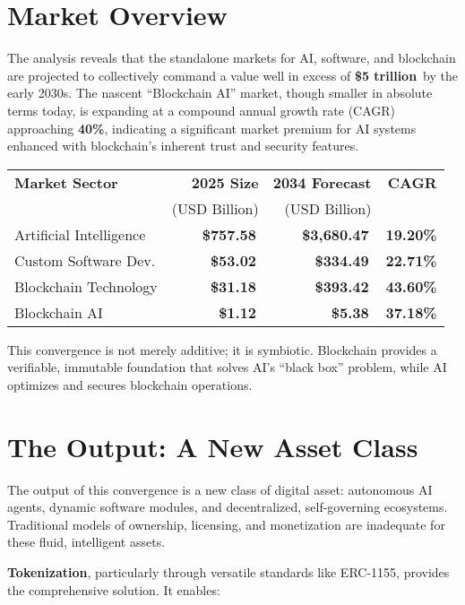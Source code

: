 \documentclass[11pt,a4paper]{report}
\newcommand{\marketvalue}[2]{\textcolor{trust}{\textbf{\$#1}}\,\textcolor{darkgray}{#2}}
\newcommand{\cagr}[1]{\textcolor{sun}{\textbf{#1\%}}}
\newcommand{\techterm}[1]{\textbf{\textcolor{ocean}{#1}}}
\begin{document}
\section*{Market Overview}
The analysis reveals that the standalone markets for AI, software, and blockchain are projected to collectively command a value well in excess of \marketvalue{5 trillion}{} by the early 2030s. The nascent ``Blockchain AI'' market, though smaller in absolute terms today, is expanding at a compound annual growth rate (CAGR) approaching \cagr{40}, indicating a significant market premium for AI systems enhanced with blockchain's inherent trust and security features.

\begin{marketfigure}
\centering
\begin{tabular}{lrrr}
\toprule
\textbf{Market Sector} & \textbf{2025 Size} & \textbf{2034 Forecast} & \textbf{CAGR} \\
& (USD Billion) & (USD Billion) & \\
\midrule
Artificial Intelligence & \marketvalue{757.58}{} & \marketvalue{3,680.47}{} & \cagr{19.20} \\
Custom Software Dev. & \marketvalue{53.02}{} & \marketvalue{334.49}{} & \cagr{22.71} \\
Blockchain Technology & \marketvalue{31.18}{} & \marketvalue{393.42}{} & \cagr{43.60} \\
Blockchain AI & \marketvalue{1.12}{} & \marketvalue{5.38}{} & \cagr{37.18} \\
\bottomrule
\end{tabular}
\end{marketfigure}

This convergence is not merely additive; it is symbiotic. Blockchain provides a verifiable, immutable foundation that solves AI's ``black box'' problem, while AI optimizes and secures blockchain operations.

\section*{The Output: A New Asset Class}
The output of this convergence is a new class of digital asset: autonomous AI agents, dynamic software modules, and decentralized, self-governing ecosystems. Traditional models of ownership, licensing, and monetization are inadequate for these fluid, intelligent assets. 

\techterm{Tokenization}, particularly through versatile standards like ERC-1155, provides the comprehensive solution. It enables:
\end{document}
